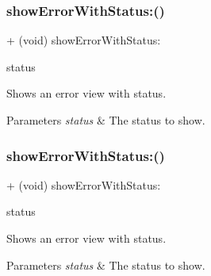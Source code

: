 \subsubsection{\texorpdfstring{show\+Error\+With\+Status\+:()}{showErrorWithStatus:()}\hspace{0.1cm}{\footnotesize\ttfamily [2/3]}}
{\footnotesize\ttfamily + (void) show\+Error\+With\+Status\+: \begin{DoxyParamCaption}\item[{(N\+S\+String $\ast$)}]{status }\end{DoxyParamCaption}}

Shows an error view with {\ttfamily status}. 
\begin{DoxyParams}{Parameters}
{\em status} & The status to show. \\
\hline
\end{DoxyParams}
\mbox{\label{interface_k_v_n_progress_a3125f228cdd6685e4cf74fa960bfa234}} 
\subsubsection{\texorpdfstring{show\+Error\+With\+Status\+:()}{showErrorWithStatus:()}\hspace{0.1cm}{\footnotesize\ttfamily [3/3]}}
{\footnotesize\ttfamily + (void) show\+Error\+With\+Status\+: \begin{DoxyParamCaption}\item[{(N\+S\+String $\ast$)}]{status }\end{DoxyParamCaption}}

Shows an error view with {\ttfamily status}. 
\begin{DoxyParams}{Parameters}
{\em status} & The status to show. \\
\hline
\end{DoxyParams}
\mbox{\label{interface_k_v_n_progress_a518bc804665bbc2a01905a6b4caf9459}} 
